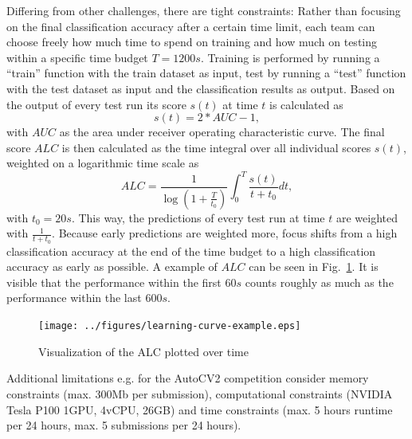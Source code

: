\documentclass{article}
\begin{document}
Differing from other challenges, there are tight constraints: Rather than focusing on the final classification accuracy after a certain time limit, each team can choose freely how much time to spend on training and how much on testing within a specific time budget $T=1200s$. Training is performed by running a ``train'' function with the train dataset as input, test by running a ``test'' function with the test dataset as input and the classification results as output. Based on the output of every test run its score $s(t)$ at time $t$ is calculated as 
%
\begin{equation}
s(t) = 2*AUC - 1, \nonumber
\end{equation} 
%
with $AUC$ as the area under receiver operating characte\-ristic curve. The final score $ALC$ is then calculated as the time integral over all individual scores $s(t)$, weighted on a logarithmic time scale as
%
\begin{equation}
ALC = \frac{1}{\log \left( 1 + \frac{T}{t_0} \right)} \int_0^T \frac{s(t)}{t+t_0} dt, \nonumber
\label{eq:ALC}
\end{equation} 
%
with $t_0=20s$. This way, the predictions of every test run at time $t$ are weighted with $\frac{1}{t+t_0}$. Because early predictions are weighted more, focus shifts from a high classification accuracy at the end of the time budget to a high classification accuracy as early as possible. A example of $ALC$ can be seen in Fig.~\ref{fig:learningCurveExample}. It is visible that the performance within the first $60s$ counts roughly as much as the performance within the last $600s$.
%
\begin{figure}[htb]
\begin{center}
 	\texttt{[image: ../figures/learning-curve-example.eps]} 
\end{center}
\caption{Visualization of the ALC plotted over time}
\label{fig:learningCurveExample}
\end{figure} 
%
Additional limitations e.g. for the AutoCV2 competition consider memory constraints (max. 300Mb per submission), computational constraints (NVIDIA Tesla P100 1GPU, 4vCPU, 26GB) and time constraints (max. 5 hours runtime per 24 hours, max. 5 submissions per 24 hours).


\end{document}
